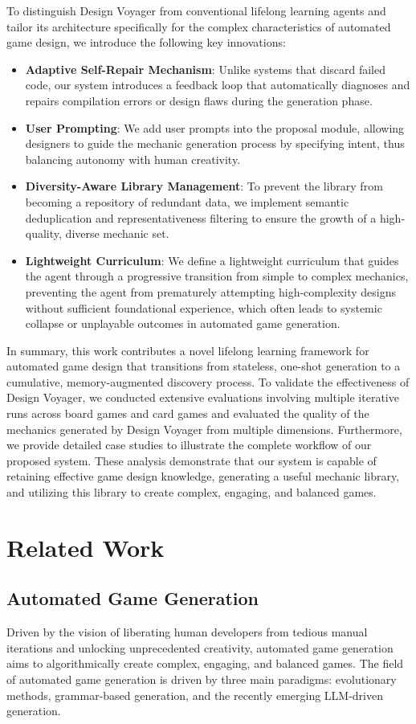 \documentclass[conference]{IEEEtran}
\begin{document}
To distinguish Design Voyager from conventional lifelong learning agents and tailor its architecture specifically for the complex characteristics of automated game design, we introduce the following key innovations:
\begin{itemize}
    \item \textbf{Adaptive Self-Repair Mechanism}: Unlike systems that discard failed code, our system introduces a feedback loop that automatically diagnoses and repairs compilation errors or design flaws during the generation phase.
    \item \textbf{User Prompting}: We add user prompts into the proposal module, allowing designers to guide the mechanic generation process by specifying intent, thus balancing autonomy with human creativity.
    \item \textbf{Diversity-Aware Library Management}: To prevent the library from becoming a repository of redundant data, we implement semantic deduplication and representativeness filtering to ensure the growth of a high-quality, diverse mechanic set.
    \item \textbf{Lightweight Curriculum}: We define a lightweight curriculum that guides the agent through a progressive transition from simple to complex mechanics, preventing the agent from prematurely attempting high-complexity designs without sufficient foundational experience, which often leads to systemic collapse or unplayable outcomes in automated game generation.
\end{itemize}

In summary, this work contributes a novel lifelong learning framework for automated game design that transitions from stateless, one-shot generation to a cumulative, memory-augmented discovery process. To validate the effectiveness of Design Voyager, we conducted extensive evaluations involving multiple iterative runs across board games and card games and evaluated the quality of the mechanics generated by Design Voyager from multiple dimensions. Furthermore, we provide detailed case studies to illustrate the complete workflow of our proposed system. These analysis demonstrate that our system is capable of retaining effective game design knowledge, generating a useful mechanic library, and utilizing this library to create complex, engaging, and balanced games.

\section{Related Work}
\subsection{Automated Game Generation}
Driven by the vision of liberating human developers from tedious manual iterations and unlocking unprecedented creativity, automated game generation aims to algorithmically create complex, engaging, and balanced games. The field of automated game generation is driven by three main paradigms: evolutionary methods, grammar-based generation, and the recently emerging LLM-driven generation.
\end{document}
